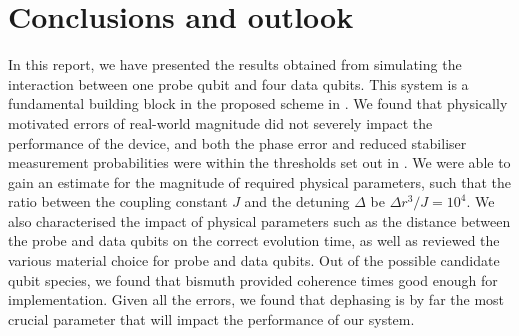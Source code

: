 
\section{Conclusions and outlook } \label{sec:conclusions}
In this report, we have presented the results obtained from simulating the interaction between one probe qubit and four data qubits. This system is a fundamental building block in the proposed scheme in \cite{the paper}. We found that physically motivated errors of real-world magnitude did not severely impact the performance of the device, and both the phase error and reduced stabiliser measurement probabilities were within the thresholds set out in \cite{the paper!!}. We were able to gain an estimate for the magnitude of required physical parameters, such that the ratio between the coupling constant $J$ and the detuning $\Delta$ be $\Delta r^3/J = 10^4$. We also characterised the impact of physical parameters such as the distance between the probe and data qubits on the correct evolution time, as well as reviewed the various material choice for probe and data qubits. Out of the possible candidate qubit species, we found that bismuth provided coherence times good enough for implementation. Given all the errors, we found that dephasing is by far the most crucial parameter that will impact the performance of our system. 




